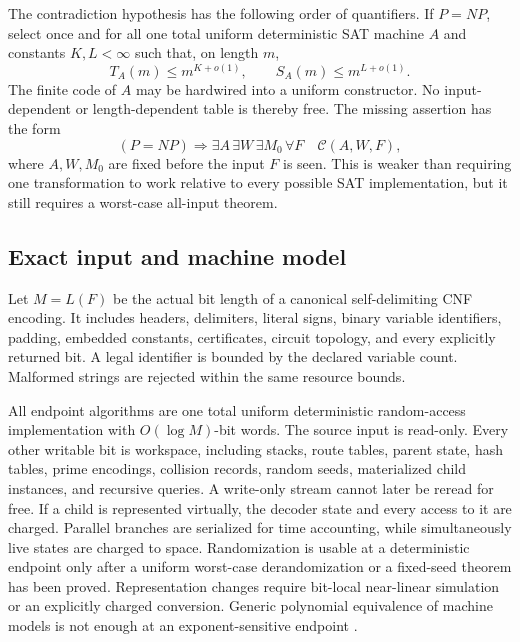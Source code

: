 \documentclass[11pt]{article}
\begin{document}
The contradiction hypothesis has the following order of quantifiers.  If
$P=NP$, select once and for all one total uniform deterministic SAT machine
$A$ and constants $K,L<\infty$ such that, on length $m$,
\begin{equation}
 T_A(m)\le m^{K+o(1)},\qquad S_A(m)\le m^{L+o(1)}.
 \label{eq:seed}
\end{equation}
The finite code of $A$ may be hardwired into a uniform constructor.  No
input-dependent or length-dependent table is thereby free.  The missing
assertion has the form
\[
 (P=NP)\Longrightarrow
 \exists A\,\exists W\,\exists M_0\,\forall F
 \quad \mathcal C(A,W,F),
\]
where $A,W,M_0$ are fixed before the input $F$ is seen.  This is weaker than
requiring one transformation to work relative to every possible SAT
implementation, but it still requires a worst-case all-input theorem.

\subsection{Exact input and machine model}

Let $M=L(F)$ be the actual bit length of a canonical self-delimiting CNF
encoding.  It includes headers, delimiters, literal signs, binary variable
identifiers, padding, embedded constants, certificates, circuit topology,
and every explicitly returned bit.  A legal identifier is bounded by the
declared variable count.  Malformed strings are rejected within the same
resource bounds.

All endpoint algorithms are one total uniform deterministic random-access
implementation with $O(\log M)$-bit words.  The source input is read-only.
Every other writable bit is workspace, including stacks, route tables,
parent state, hash tables, prime encodings, collision records, random seeds,
materialized child instances, and recursive queries.  A write-only stream
cannot later be reread for free.  If a child is represented virtually, the
decoder state and every access to it are charged.  Parallel branches are
serialized for time accounting, while simultaneously live states are
charged to space.  Randomization is usable at a deterministic endpoint only
after a uniform worst-case derandomization or a fixed-seed theorem has been
proved.  Representation changes require bit-local near-linear simulation or
an explicitly charged conversion.  Generic polynomial equivalence of
machine models is not enough at an exponent-sensitive endpoint
\cite[Section~2.1]{fortnowetal2005}.
\end{document}

